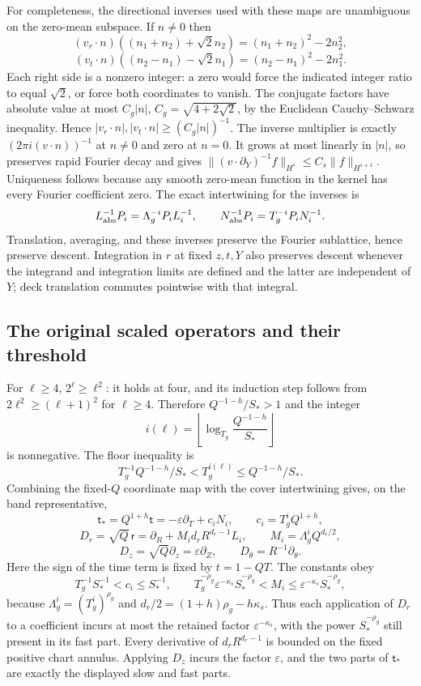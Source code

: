 \documentclass[10pt,a4paper]{article}
\begin{document}
For completeness, the directional inverses used with these maps are
unambiguous on the zero-mean subspace.  If $n\ne0$ then
\[
 (v_r\cdot n)((n_1+n_2)+\sqrt2n_2)=(n_1+n_2)^2-2n_2^2,
\]
\[
 (v_t\cdot n)((n_2-n_1)-\sqrt2n_1)=(n_2-n_1)^2-2n_1^2.
\]
Each right side is a nonzero integer: a zero would force the indicated
integer ratio to equal $\sqrt2$, or force both coordinates to vanish.
The conjugate factors have absolute value at most
$C_g|n|$, $C_g=\sqrt{4+2\sqrt2}$, by the Euclidean Cauchy--Schwarz
inequality.  Hence $|v_r\cdot n|,|v_t\cdot n|\ge(C_g|n|)^{-1}$.
The inverse multiplier is exactly $(2\pi i(v\cdot n))^{-1}$ at
$n\ne0$ and zero at $n=0$.  It grows at most linearly in $|n|$,
so preserves rapid Fourier decay and gives
$\|(v\cdot\partial_Y)^{-1}f\|_{H^s}\le C_s\|f\|_{H^{s+1}}$.
Uniqueness follows because any smooth zero-mean function in the kernel
has every Fourier coefficient zero.  The exact intertwining for the
inverses is
\[
 L_{\rm abs}^{-1}P_i=\Lambda_g^{-i}P_iL_i^{-1},\qquad
 N_{\rm abs}^{-1}P_i=T_g^{-i}P_iN_i^{-1}.
\]
Translation, averaging, and these inverses preserve the Fourier
sublattice, hence preserve descent.  Integration in $r$ at fixed
$z,t,Y$ also preserves descent whenever the integrand and integration
limits are defined and the latter are independent of $Y$; deck
translation commutes pointwise with that integral.

\subsection{The original scaled operators and their threshold}
For $\ell\ge4$, $2^\ell\ge\ell^2$: it holds at four, and its induction
step follows from $2\ell^2\ge(\ell+1)^2$ for $\ell\ge4$.
Therefore $Q^{-1-h}/S_*>1$ and the integer
\[
 i(\ell)=\left\lfloor\log_{T_g}\frac{Q^{-1-h}}{S_*}\right\rfloor
\]
is nonnegative.  The floor inequality is
\[
 T_g^{-1}Q^{-1-h}/S_*<T_g^{i(\ell)}\le Q^{-1-h}/S_*.
\]
Combining the fixed-$Q$ coordinate map with the cover intertwining
gives, on the band representative,
\[
 \mathsf t_*=Q^{1+h}\mathsf t=-\varepsilon\partial_T+c_iN_i,
 \qquad c_i=T_g^iQ^{1+h},
\]
\[
 D_r=\sqrt Q\,\mathsf r
 =\partial_R+M_id_rR^{d_r-1}L_i,
 \qquad M_i=\Lambda_g^iQ^{d_r/2},
\]
\[
 D_z=\sqrt Q\partial_z=\varepsilon\partial_Z,
 \qquad D_\theta=R^{-1}\partial_\theta.
\]
Here the sign of the time term is fixed by $t=1-QT$.  The constants obey
\[
 T_g^{-1}S_*^{-1}<c_i\le S_*^{-1},\qquad
 T_g^{-\rho_g}\varepsilon^{-\kappa_s}S_*^{-\rho_g}
 <M_i\le\varepsilon^{-\kappa_s}S_*^{-\rho_g},
\]
because $\Lambda_g^i=(T_g^i)^{\rho_g}$ and
$d_r/2=(1+h)\rho_g-h\kappa_s$.  Thus each application of $D_r$ to
a coefficient incurs at most the retained factor
$\varepsilon^{-\kappa_s}$, with the power $S_*^{-\rho_g}$ still
present in its fast part.  Every derivative of $d_rR^{d_r-1}$ is
bounded on the fixed positive chart annulus.  Applying $D_z$ incurs
the factor $\varepsilon$, and the two parts of $\mathsf t_*$ are
exactly the displayed slow and fast parts.
\end{document}
